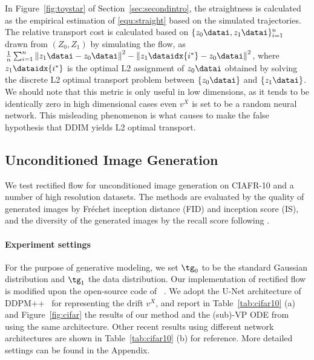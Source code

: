 \documentclass[11pt]{article}
\newcommand{\norm}[1]{\left\|#1\right\|}
\begin{document}
In Figure~\ref{fig:toystar} of Section~\ref{sec:secondintro},  
the straightness is calculated as the empirical estimation of \eqref{equ:straight} based on the simulated trajectories.
The relative transport cost is calculated based on  $\{z_0\datai,z_1\datai\}_{i=1}^n$ drawn from $(Z_0,Z_1)$ by simulating the flow, as $\frac{1}{n}\sum_{i=1}^n \norm{z_1\datai-z_0\datai}^2 - \norm{z_1\dataidx{i^*}-z_0\datai}^2$, where $z_1\dataidx{i^*}$ is the optimal L2 assignment of $z_0\datai$ obtained by solving the discrete L2 optimal transport problem between $\{z_0\datai\}$ and $\{z_1\datai\}$. 
We should 
note that this metric is only useful in low dimensions, as it tends to be identically zero in high dimensional cases 
even $v^X$ is set to be a random neural network.
This misleading phenomenon is what causes  \cite{khrulkov2022understanding} to make the false hypothesis that DDIM yields L2 optimal transport. 


\subsection{Unconditioned Image Generation}
\label{sec:exp:cifar}



We test rectified flow for unconditioned image generation on CIAFR-10 and a number of high resolution datasets. 
The methods are evaluated by the quality of generated images by Fréchet inception distance (FID) and inception score (IS), 
 and the diversity of the generated images by the recall score  following \citep{kynkaanniemi2019improved}.

\paragraph{Experiment settings}
For the purpose of generative modeling, we set $\tg_0$ to be the standard Gaussian distribution and $\tg_1$ the data distribution. 
Our implementation of rectified flow is modified upon the open-source code of ~\citep{song2020score}. %
We adopt the U-Net architecture of DDPM++~\cite{song2020score} for representing the drift $v^X$, 
and report in Table~\ref{tab:cifar10} (a)  and Figure~\ref{fig:cifar} the results of our method and the (sub)-VP ODE from \cite{song2020score} using the same architecture.  
Other recent results using different network architectures are shown in Table~\ref{tab:cifar10} (b) for reference. 
More detailed settings can be found in the Appendix.
\end{document}
